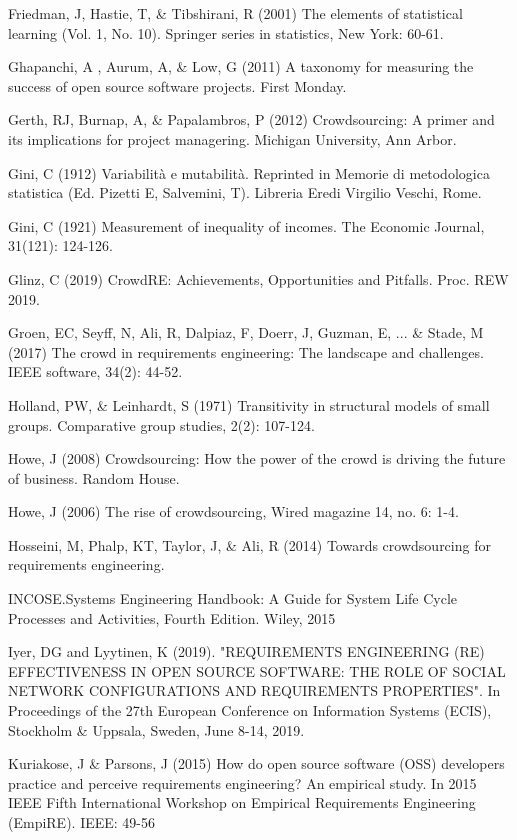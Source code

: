 \begin{thebibliography}{}
Friedman, J, Hastie, T, \& Tibshirani, R (2001) The elements of statistical learning (Vol. 1, No. 10). Springer series in statistics, New York: 60-61.

Ghapanchi, A , Aurum, A, \& Low, G (2011) A taxonomy for measuring the success of open source software projects. First Monday.

Gerth, RJ, Burnap, A, \& Papalambros, P (2012) Crowdsourcing: A primer and its implications for project managering. Michigan University, Ann Arbor.

Gini, C (1912) Variabilità e mutabilità. Reprinted in Memorie di metodologica statistica (Ed. Pizetti E, Salvemini, T). Libreria Eredi Virgilio Veschi, Rome.

Gini, C (1921) Measurement of inequality of incomes. The Economic Journal, 31(121): 124-126.

Glinz, C (2019) CrowdRE: Achievements, Opportunities and Pitfalls. Proc. REW 2019. 

Groen, EC, Seyff, N, Ali, R, Dalpiaz, F, Doerr, J, Guzman, E, ... \& Stade, M (2017) The crowd in requirements engineering: The landscape and challenges. IEEE software, 34(2): 44-52.

Holland, PW, \& Leinhardt, S (1971) Transitivity in structural models of small groups. Comparative group studies, 2(2): 107-124.

Howe, J (2008) Crowdsourcing: How the power of the crowd is driving the future of business. Random House.

Howe, J (2006) The rise of crowdsourcing, Wired magazine 14, no. 6: 1-4.

Hosseini, M, Phalp, KT, Taylor, J, \& Ali, R (2014) Towards crowdsourcing for requirements engineering.

INCOSE.Systems Engineering Handbook: A Guide for System Life Cycle Processes and Activities, Fourth Edition. Wiley, 2015

Iyer, DG and Lyytinen, K (2019). "REQUIREMENTS ENGINEERING (RE) EFFECTIVENESS IN OPEN SOURCE SOFTWARE: THE ROLE OF SOCIAL NETWORK CONFIGURATIONS AND REQUIREMENTS PROPERTIES". In Proceedings of the 27th European Conference on Information Systems (ECIS), Stockholm \& Uppsala, Sweden, June 8-14, 2019.

Kuriakose, J \& Parsons, J (2015) How do open source software (OSS) developers practice and perceive requirements engineering? An empirical study. In 2015 IEEE Fifth International Workshop on Empirical Requirements Engineering (EmpiRE). IEEE: 49-56


\end{thebibliography}
